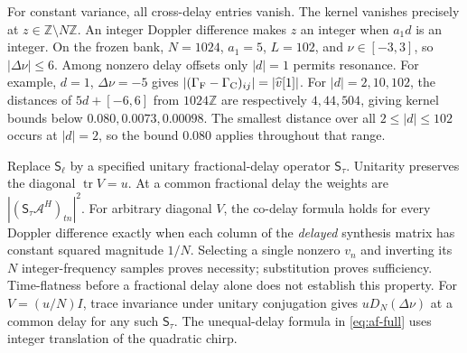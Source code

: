 For constant variance, all cross-delay entries vanish. The kernel
vanishes precisely at $z\in\mathbb Z\setminus N\mathbb Z$. An integer
Doppler difference makes $z$ an integer when $a_1d$ is an integer.
On the frozen bank, $N=1024$, $a_1=5$, $L=102$, and
$\nu\in[-3,3]$, so $|\Delta\nu|\le6$. Among nonzero delay offsets
only $|d|=1$ permits resonance. For example, $d=1$, $\Delta\nu=-5$
gives $|(\Gamma_{\rm F}-\Gamma_{\rm C})_{ij}|=|\widehat v[1]|$.
For $|d|=2,10,102$, the distances of $5d+[-6,6]$ from
$1024\mathbb Z$ are respectively $4,44,504$, giving kernel bounds
below $0.080,0.0073,0.00098$. The smallest distance over all
$2\le|d|\le102$ occurs at $|d|=2$, so the bound $0.080$ applies
throughout that range.

\begin{afdmremark}
Replace $\mathsf S_\ell$ by a specified unitary fractional-delay
operator $\mathsf S_\tau$. Unitarity preserves the diagonal
$\operatorname{tr}V=u$. At a common fractional delay the weights are
$|(\mathsf S_\tau\mathcal A^H)_{tn}|^2$. For arbitrary diagonal $V$,
the co-delay formula holds for every Doppler difference exactly when
each column of the \emph{delayed} synthesis matrix has constant
squared magnitude $1/N$. Selecting a single nonzero $v_n$ and
inverting its $N$ integer-frequency samples proves necessity;
substitution proves sufficiency. Time-flatness before a fractional
delay alone does not establish this property. For $V=(u/N)I$, trace
invariance under unitary conjugation gives $uD_N(\Delta\nu)$ at a
common delay for any such $\mathsf S_\tau$. The unequal-delay formula
in \eqref{eq:af-full} uses integer translation of the quadratic chirp.
\end{afdmremark}

